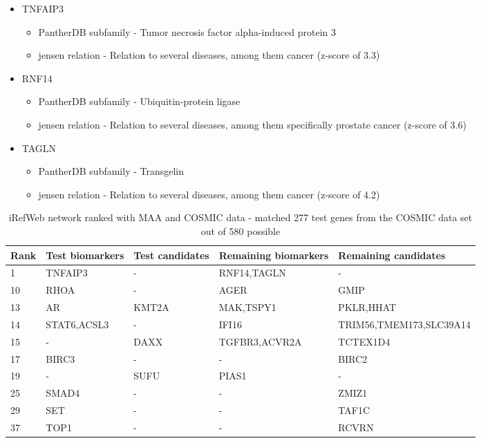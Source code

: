 \begin{itemize}
    \item TNFAIP3
        \begin{itemize}
            \item PantherDB subfamily - Tumor necrosis factor alpha-induced
                protein 3
            \item \gls{jensen} relation - Relation to several diseases, among them
                cancer (z-score of 3.3)
        \end{itemize}
    \item RNF14
        \begin{itemize}
            \item PantherDB subfamily - Ubiquitin-protein ligase
            \item \gls{jensen} relation - Relation to several diseases, among them
                specifically prostate cancer (z-score of 3.6)
        \end{itemize}
    \item TAGLN
        \begin{itemize}
            \item PantherDB subfamily - Transgelin
            \item \gls{jensen} relation - Relation to several diseases, among them
                cancer (z-score of 4.2)
        \end{itemize}
\end{itemize}
\begin{sidewaystable}
    \begin{tabular}{|l|l|l|l|l|}
        \hline
        \textbf{Rank}
        & \textbf{Test biomarkers}
        & \textbf{Test candidates}
        & \textbf{Remaining biomarkers}
        & \textbf{Remaining candidates} \\
        \hline
        1	& TNFAIP3	& -	& RNF14,TAGLN	& - \\
        \hline
        10	& RHOA	& -	& AGER	& GMIP \\
        \hline
        13	& AR	& KMT2A	& MAK,TSPY1	& PKLR,HHAT \\
        \hline
        14	& STAT6,ACSL3	& -	& IFI16	& TRIM56,TMEM173,SLC39A14 \\
        \hline
        15	& -	& DAXX	& TGFBR3,ACVR2A	& TCTEX1D4 \\
        \hline
        17	& BIRC3	& -	& -	& BIRC2 \\
        \hline
        19	& -	& SUFU	& PIAS1	& - \\
        \hline
        25	& SMAD4	& -	& -	& ZMIZ1 \\
        \hline
        29	& SET	& -	& -	& TAF1C \\
        \hline
        37	& TOP1	& -	& -	& RCVRN \\
        \hline
    \end{tabular}
    \caption{iRefWeb network ranked with MAA and COSMIC data - matched 277 test
    genes from the COSMIC data set out of 580 possible}
    \label{tab:maa-cosmic}
\end{sidewaystable}

